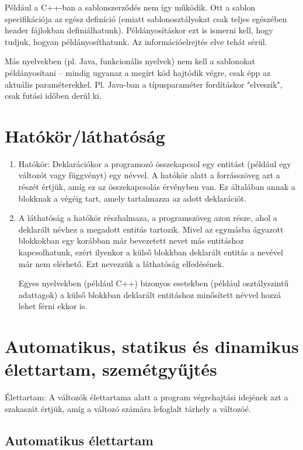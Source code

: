 \documentclass[margin=0px]{article}
\begin{document}
	Például a C++-ban a sablonszerződés nem így működik. Ott a sablon specifikációja az egész
	definíció (emiatt sablonosztályokat csak teljes egészében header fájlokban definiálhatunk).
	Példányosításkor ezt is ismerni kell, hogy tudjuk, hogyan példányosíthatunk. Az információelrejtés
	elve tehát sérül.
	
	Más nyelvekben (pl. Java, funkcionális nyelvek) nem kell a sablonokat példányosítani – mindig ugyanaz a
	megírt kód hajtódik végre, csak épp az aktuális paraméterekkel. Pl. Java-ban a típusparaméter fordításkor "elveszik",
	csak futási időben derül ki.
	
	\section{Hatókör/láthatóság}
	
	\begin{enumerate}
		\item	Hatókör: Deklarációkor a programozó összekapcsol egy entitást (például egy változót vagy függvényt) egy névvel. A hatókör alatt a forrásszöveg azt a részét értjük, amíg ez az összekapcsolás érvényben van. Ez általában annak a blokknak a végéig tart, amely tartalmazza az adott deklarációt.
		
		\item	A láthatóság a hatókör részhalmaza, a programszöveg azon része, ahol a deklarált névhez a megadott entitás tartozik. Mivel az egymásba ágyazott blokkokban egy korábban már bevezetett nevet más entitáshoz kapcsolhatunk, ezért ilyenkor a külső blokkban deklarált entitás a nevével már nem elérhető. Ezt nevezzük a láthatóság elfedésének.
		
		Egyes nyelvekben (például C++) bizonyos esetekben (például osztályszintű adattagok) a külső blokkban deklarált entitáshoz minősített névvel hozzá lehet férni ekkor is.
	\end{enumerate}
	
	\section{Automatikus, statikus és dinamikus élettartam, szemétgyűjtés}
	Élettartam: A változók élettartama alatt a program végrehajtási idejének azt a szakaszát értjük, amíg a változó számára lefoglalt tárhely a változóé.
	
	\subsection{Automatikus élettartam}
	
\end{document}
